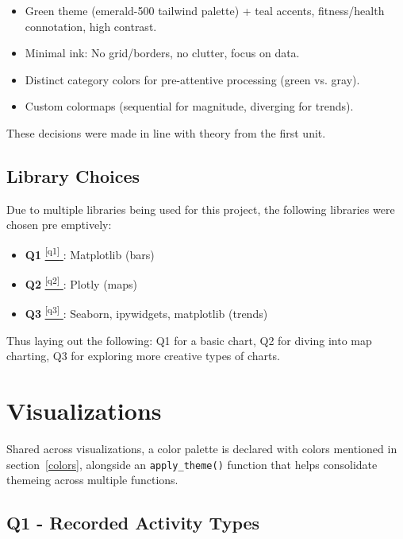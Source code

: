 \documentclass[a4paper,11pt]{article}
\newcommand*{\sref}[1]{%
  \hyperref[{#1}]{%
    \color{accent}\textsuperscript{\ref*{#1}}%
  }%
}
\begin{document}
\begin{itemize}
	\item Green theme (emerald-500 tailwind\autocite{tailwindcolors} palette) +
	      teal accents, fitness/health
	      connotation, high contrast.
	\item Minimal ink: No grid/borders, no clutter, focus on data.
	\item Distinct category colors for pre-attentive processing (green vs. gray).
	\item Custom colormaps (sequential for magnitude, diverging for trends).
\end{itemize}

\par
These decisions were made in line with theory from the first unit.

\subsection{Library Choices}

\par
Due to multiple libraries being used for this project, the following libraries
were chosen pre emptively:

\begin{itemize}
	\item \textbf{Q1}\sref{q1}: Matplotlib\autocite{matplotlib} (bars)
	\item \textbf{Q2}\sref{q2}: Plotly\autocite{plotly} (maps)
	\item \textbf{Q3}\sref{q3}: Seaborn\autocite{seaborn},
	      ipywidgets\autocite{ipywidgets}, matplotlib\autocite{matplotlib} (trends)
\end{itemize}

Thus laying out the following: Q1 for a basic chart, Q2 for diving into map
charting, Q3 for exploring more creative types of charts.

\section{Visualizations}

\par
Shared across visualizations, a color palette is declared with colors mentioned
in section~\ref{colors}, alongside an \texttt{apply\_theme()} function that
helps consolidate themeing across multiple functions.

\subsection{Q1 - Recorded Activity Types}
\end{document}
